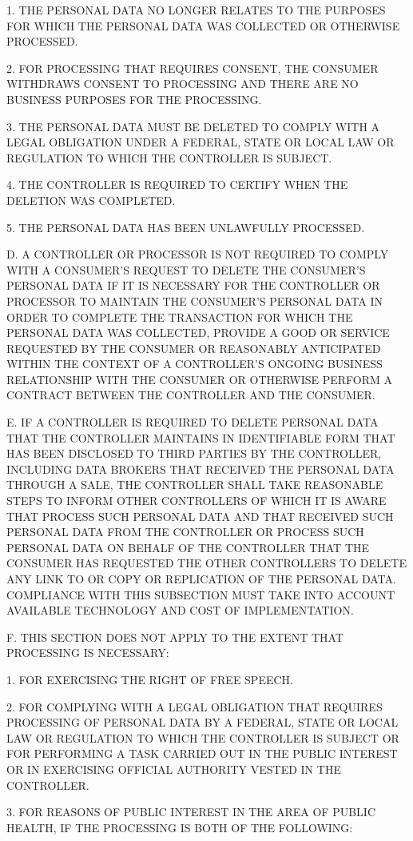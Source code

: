 1. THE PERSONAL DATA NO LONGER RELATES TO THE PURPOSES FOR WHICH THE PERSONAL DATA WAS COLLECTED OR OTHERWISE PROCESSED.

2. FOR PROCESSING THAT REQUIRES CONSENT, THE CONSUMER WITHDRAWS CONSENT TO PROCESSING AND THERE ARE NO BUSINESS PURPOSES FOR THE PROCESSING.

3. THE PERSONAL DATA MUST BE DELETED TO COMPLY WITH A LEGAL OBLIGATION UNDER A FEDERAL, STATE OR LOCAL LAW OR REGULATION TO WHICH THE CONTROLLER IS SUBJECT.

4. THE CONTROLLER IS REQUIRED TO CERTIFY WHEN THE DELETION WAS COMPLETED.

5. THE PERSONAL DATA HAS BEEN UNLAWFULLY PROCESSED.

D. A CONTROLLER OR PROCESSOR IS NOT REQUIRED TO COMPLY WITH A CONSUMER'S REQUEST TO DELETE THE CONSUMER'S PERSONAL DATA IF IT IS NECESSARY FOR THE CONTROLLER OR PROCESSOR TO MAINTAIN THE CONSUMER'S PERSONAL DATA IN ORDER TO COMPLETE THE TRANSACTION FOR WHICH THE PERSONAL DATA WAS COLLECTED, PROVIDE A GOOD OR SERVICE REQUESTED BY THE CONSUMER OR REASONABLY ANTICIPATED WITHIN THE CONTEXT OF A CONTROLLER'S ONGOING BUSINESS RELATIONSHIP WITH THE CONSUMER OR OTHERWISE PERFORM A CONTRACT BETWEEN THE CONTROLLER AND THE CONSUMER.

E. IF A CONTROLLER IS REQUIRED TO DELETE PERSONAL DATA THAT THE CONTROLLER MAINTAINS IN IDENTIFIABLE FORM THAT HAS BEEN DISCLOSED TO THIRD PARTIES BY THE CONTROLLER, INCLUDING DATA BROKERS THAT RECEIVED THE PERSONAL DATA THROUGH A SALE, THE CONTROLLER SHALL TAKE REASONABLE STEPS TO INFORM OTHER CONTROLLERS OF WHICH IT IS AWARE THAT PROCESS SUCH PERSONAL DATA AND THAT RECEIVED SUCH PERSONAL DATA FROM THE CONTROLLER OR PROCESS SUCH PERSONAL DATA ON BEHALF OF THE CONTROLLER THAT THE CONSUMER HAS REQUESTED THE OTHER CONTROLLERS TO DELETE ANY LINK TO OR COPY OR REPLICATION OF THE PERSONAL DATA. COMPLIANCE WITH THIS SUBSECTION MUST TAKE INTO ACCOUNT AVAILABLE TECHNOLOGY AND COST OF IMPLEMENTATION.

F. THIS SECTION DOES NOT APPLY TO THE EXTENT THAT PROCESSING IS NECESSARY:

1. FOR EXERCISING THE RIGHT OF FREE SPEECH.

2. FOR COMPLYING WITH A LEGAL OBLIGATION THAT REQUIRES PROCESSING OF PERSONAL DATA BY A FEDERAL, STATE OR LOCAL LAW OR REGULATION TO WHICH THE CONTROLLER IS SUBJECT OR FOR PERFORMING A TASK CARRIED OUT IN THE PUBLIC INTEREST OR IN EXERCISING OFFICIAL AUTHORITY VESTED IN THE CONTROLLER.

3. FOR REASONS OF PUBLIC INTEREST IN THE AREA OF PUBLIC HEALTH, IF THE PROCESSING IS BOTH OF THE FOLLOWING:

